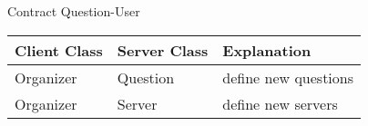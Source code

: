 \begin{subsubsection}{Contract Question-User}
	\begin{tabular}{l l l }
	  Client Class & Server Class & Explanation\\ \hline
	  Organizer & Question & define new questions\\
	  Organizer & Server & define new servers\\
	\end{tabular}
\end{subsubsection}